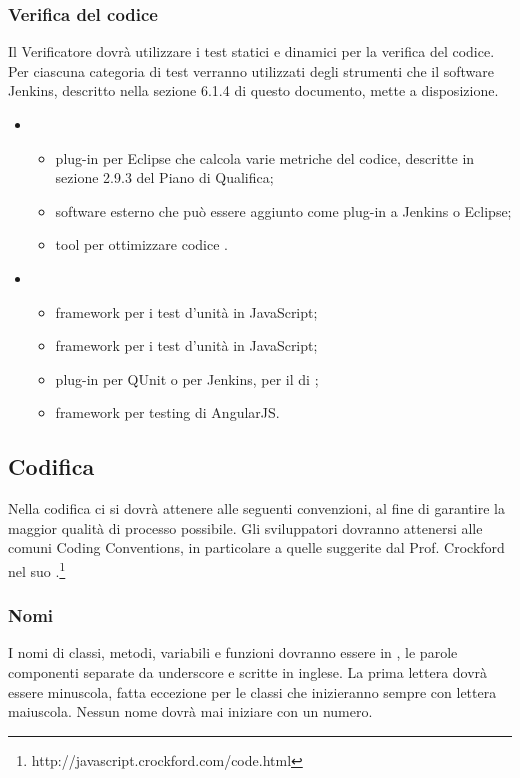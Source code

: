 \subsubsection{Verifica del codice}
Il Verificatore dovrà utilizzare i test statici e dinamici per la verifica del codice. Per ciascuna categoria di test verranno utilizzati degli strumenti che il software Jenkins, descritto nella sezione 6.1.4 di questo documento, mette a disposizione.
\begin{itemize}
\item {}
\begin{itemize}
\item {}plug-in per Eclipse che calcola varie metriche del codice, descritte in sezione 2.9.3 del Piano di Qualifica;
\item {}software esterno che può essere aggiunto come plug-in a Jenkins o Eclipse;
\item {}tool per ottimizzare codice .
\end{itemize}
\item {}
\begin{itemize}
\item {}framework per i test d'unità in JavaScript;
\item {}framework per i test d'unità in JavaScript;
\item {}plug-in per QUnit o per Jenkins, per il  di ;
\item {}framework per testing di AngularJS.
\end{itemize}
\end{itemize}

\subsection{Codifica}
\label{}
Nella codifica ci si dovrà attenere alle seguenti convenzioni, al fine di garantire la maggior qualità di processo possibile.
Gli sviluppatori dovranno attenersi alle comuni Coding Conventions, in particolare a quelle suggerite dal Prof. Crockford nel suo .\footnote{http://javascript.crockford.com/code.html}\\

\subsubsection{Nomi}
\label{}
I nomi di classi, metodi, variabili e funzioni dovranno essere in , le parole componenti separate da underscore e scritte in inglese.
La prima lettera dovrà essere minuscola, fatta eccezione per le classi che inizieranno sempre con lettera maiuscola.
Nessun nome dovrà mai iniziare con un numero.

